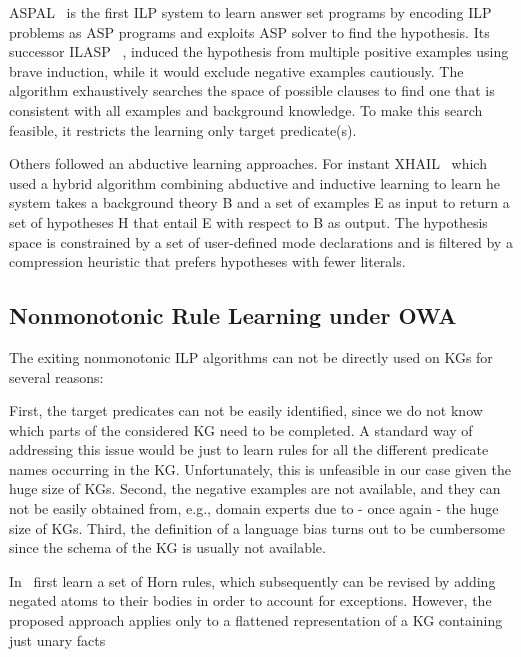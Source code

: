 ASPAL~\cite{} is the first ILP system to learn answer set programs by encoding ILP problems
as ASP programs and exploits ASP solver to find the hypothesis. Its successor ILASP ~\cite{}, induced the hypothesis from
multiple positive examples using brave induction, while it would exclude
negative examples cautiously. The algorithm exhaustively searches the space of possible clauses to find one that
is consistent with all examples and background knowledge. To make this search feasible, it restricts the learning only target predicate(s).

Others followed an abductive learning approaches. For instant XHAIL~\cite{XHAIL} which used a hybrid algorithm combining abductive and inductive learning to learn 
he system takes a background theory B and a set of examples E as input to return a set of hypotheses H that entail E with respect to B as output. The hypothesis space is constrained by a set of user-defined mode declarations and is filtered by a compression heuristic that prefers hypotheses with fewer literals.



\subsection{Nonmonotonic Rule Learning under OWA}
The exiting nonmonotonic ILP algorithms can not be directly used on KGs for several reasons:

 First, the target predicates can not be easily identified, since
we do not know which parts of the considered KG need to be completed. A standard
way of addressing this issue would be just to learn rules for all the different predicate
names occurring in the KG. Unfortunately, this is unfeasible in our case given the huge
size of KGs. Second, the negative examples are not available, and they can not be easily
obtained from, e.g., domain experts due to - once again - the huge size of KGs. Third,
the definition of a language bias turns out to be cumbersome since the schema of the
KG is usually not available.



 In~\cite{gad2016} first learn a set of Horn rules, which subsequently can be revised by
adding negated atoms to their bodies in order to account for exceptions. However, the
proposed approach applies only to a flattened representation of a KG containing just
unary facts

